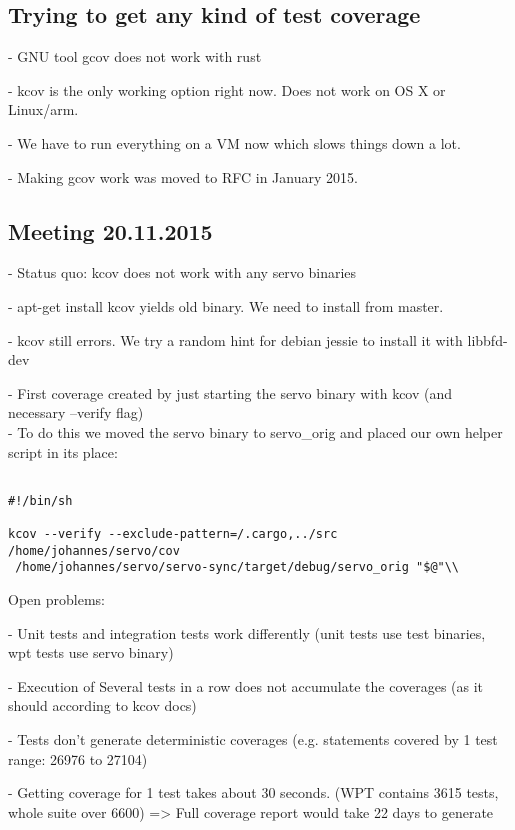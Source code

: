 \documentclass{scrartcl}
\begin{document}
\subsection*{Trying to get any kind of test coverage}
- GNU tool gcov does not work with rust

- kcov is the only working option right now. Does not work on OS X or Linux/arm.

- We have to run everything on a VM now which slows things down a lot.

- Making gcov work was moved to RFC in January 2015.

\subsection*{Meeting 20.11.2015}
- Status quo: kcov does not work with any servo binaries

- apt-get install kcov yields old binary. We need to install from master.

- kcov still errors. We try a random hint for debian jessie to install it with libbfd-dev

- First coverage created by just starting the servo binary with kcov (and necessary --verify flag)\\

- To do this we moved the servo binary to servo\_orig and placed our own helper script in its place:

\lstset{language=Python}  
\begin{lstlisting}

#!/bin/sh

kcov --verify --exclude-pattern=/.cargo,../src /home/johannes/servo/cov 
 /home/johannes/servo/servo-sync/target/debug/servo_orig "$@"\\

\end{lstlisting}

Open problems:

- Unit tests and integration tests work differently (unit tests use test binaries, wpt tests use servo binary)

- Execution of Several tests in a row does not accumulate the coverages (as it should according to kcov docs)

- Tests don't generate deterministic coverages (e.g. statements covered by 1 test range: 26976 to 27104)

- Getting coverage for 1 test takes about 30 seconds. (WPT contains 3615 tests, whole suite over 6600) => Full coverage report would take 22 days to generate
\end{document}
